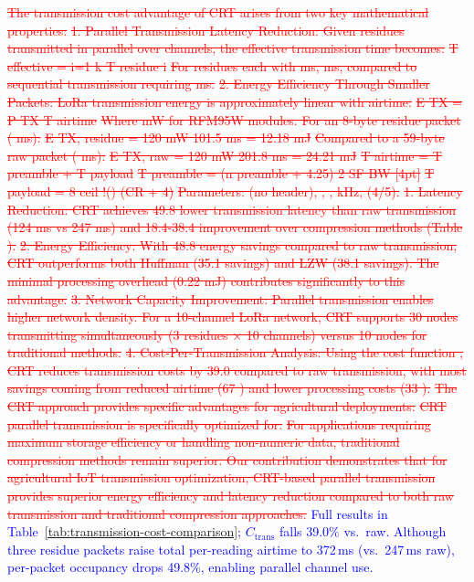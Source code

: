 \documentclass[pdflatex,sn-mathphys-num]{sn-jnl}
\theoremstyle{thmstyleone}
\theoremstyle{thmstyletwo}
\theoremstyle{thmstylethree}
\begin{document}
{\textcolor{red}{\sout{The transmission cost advantage of CRT arises from two key mathematical properties:}}
\textcolor{red}{\sout{1. Parallel Transmission Latency Reduction: Given residues transmitted in parallel over channels, the effective transmission time becomes:}}
\textcolor{red}{\sout{T effective = i=1 k T residue i}}
\textcolor{red}{\sout{For residues each with ms, ms, compared to sequential transmission requiring ms.}}
\textcolor{red}{\sout{2. Energy Efficiency Through Smaller Packets: LoRa transmission energy is approximately linear with airtime:}}
\textcolor{red}{\sout{E TX = P TX T airtime}}
\textcolor{red}{\sout{Where mW for RFM95W modules. For an 8-byte residue packet ( ms):}}
\textcolor{red}{\sout{E TX, residue = 120 mW 101.5 ms = 12.18 mJ}}
\textcolor{red}{\sout{Compared to a 59-byte raw packet ( ms):}}
\textcolor{red}{\sout{E TX, raw = 120 mW 201.8 ms = 24.21 mJ}}
\textcolor{red}{\sout{T airtime = T preamble + T payload}}
\textcolor{red}{\sout{T preamble = (n preamble + 4.25) 2 SF BW [4pt]}}
\textcolor{red}{\sout{T payload = 8 ceil !() (CR + 4)}}
\textcolor{red}{\sout{Parameters: (no header), , , kHz, (4/5).}}
\textcolor{red}{\sout{1. Latency Reduction: CRT achieves 49.8 lower transmission latency than raw transmission (124 ms vs 247 ms) and 18.4-38.4 improvement over compression methods (Table ).}}
\textcolor{red}{\sout{2. Energy Efficiency: With 48.8 energy savings compared to raw transmission, CRT outperforms both Huffman (35.1 savings) and LZW (38.1 savings). The minimal processing overhead (0.22 mJ) contributes significantly to this advantage.}}
\textcolor{red}{\sout{3. Network Capacity Improvement: Parallel transmission enables higher network density. For a 10-channel LoRa network, CRT supports 30 nodes transmitting simultaneously (3 residues × 10 channels) versus 10 nodes for traditional methods.}}
\textcolor{red}{\sout{4. Cost-Per-Transmission Analysis: Using the cost function , CRT reduces transmission costs by 39.0 compared to raw transmission, with most savings coming from reduced airtime (67 ) and lower processing costs (33 ).}}
\textcolor{red}{\sout{The CRT approach provides specific advantages for agricultural deployments:}}
\textcolor{red}{\sout{CRT parallel transmission is specifically optimized for:}}
\textcolor{red}{\sout{For applications requiring maximum storage efficiency or handling non-numeric data, traditional compression methods remain superior. Our contribution demonstrates that for agricultural IoT transmission optimization, CRT-based parallel transmission provides superior energy efficiency and latency reduction compared to both raw transmission and traditional compression approaches.}}
\textcolor{blue}{Full results in Table~\ref{tab:transmission-cost-comparison}; $C_{\text{trans}}$ falls 39.0\% vs.\ raw. Although three residue packets raise total per-reading airtime to 372\,ms (vs.\ 247\,ms raw), per-packet occupancy drops 49.8\%, enabling parallel channel use.}

}
\end{document}
